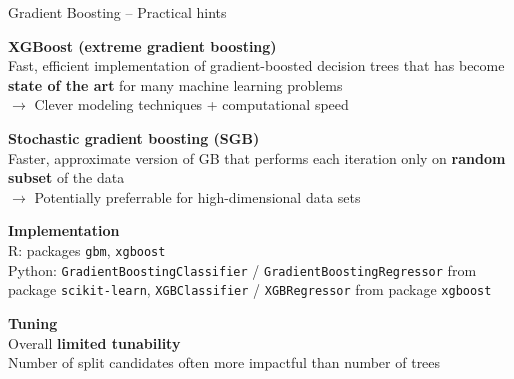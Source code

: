 \documentclass[11pt,compress,t,notes=noshow, xcolor=table]{beamer}
\newcommand{\highlight}[1]{\textcolor{highlightcol}{\textbf{#1}}}
\let\code=\texttt
\begin{document}
\begin{frame}{Gradient Boosting -- Practical hints}

\footnotesize

\highlight{XGBoost (extreme gradient boosting)} \\
\smallskip
Fast, efficient implementation of gradient-boosted decision trees that has
become \textbf{state of the art} for many machine learning problems \\
$\rightarrow$ Clever modeling techniques + computational speed \\

\lz

\highlight{Stochastic gradient boosting (SGB)} \\
\smallskip
Faster, approximate version of GB that performs each iteration only on 
\textbf{random subset} of the data \\
$\rightarrow$ Potentially preferrable for high-dimensional data sets 

\lz

\highlight{Implementation} \\
\smallskip
R: packages \code{gbm}, \code{xgboost}\\
Python: \code{GradientBoostingClassifier} / \code{GradientBoostingRegressor} 
from package \code{scikit-learn}, \code{XGBClassifier} / 
\code{XGBRegressor} from package \code{xgboost}
\lz

\highlight{Tuning} \\
\smallskip
Overall \textbf{limited tunability} \\
Number of split candidates often more impactful than number of trees

\end{frame}

\end{document}

